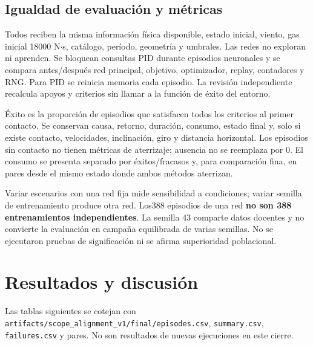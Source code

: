 \documentclass[12pt,a4paper]{article}
\begin{document}
\subsection{Igualdad de evaluación y métricas}
Todos reciben la misma información física disponible,\allowbreak{} estado inicial,\allowbreak{} viento,\allowbreak{} gas inicial 18000 N\ensuremath{\cdot}s,\allowbreak{} catálogo,\allowbreak{} período,\allowbreak{} geometría y umbrales. Las redes no exploran ni aprenden. Se bloquean consultas PID durante episodios neuronales y se compara antes/\allowbreak{}después red principal,\allowbreak{} objetivo,\allowbreak{} optimizador,\allowbreak{} replay,\allowbreak{} contadores y RNG. Para PID se reinicia memoria cada episodio. La revisión independiente recalcula apoyos y criterios sin llamar a la función de éxito del entorno.


Éxito es la proporción de episodios que satisfacen todos los criterios al primer contacto. Se conservan causa,\allowbreak{} retorno,\allowbreak{} duración,\allowbreak{} consumo,\allowbreak{} estado final y,\allowbreak{} solo si existe contacto,\allowbreak{} velocidades,\allowbreak{} inclinación,\allowbreak{} giro y distancia horizontal. Los episodios sin contacto no tienen métricas de aterrizaje; ausencia no se reemplaza por 0. El consumo se presenta separado por éxitos/\allowbreak{}fracasos y,\allowbreak{} para comparación fina,\allowbreak{} en pares desde el mismo estado donde ambos métodos aterrizan.


Variar escenarios con una red fija mide sensibilidad a condiciones; variar semilla de entrenamiento produce otra red. Los388 episodios de una red \textbf{no son 388 entrenamientos independientes}. La semilla 43 comparte datos docentes y no convierte la evaluación en campaña equilibrada de varias semillas. No se ejecutaron pruebas de significación ni se afirma superioridad poblacional.



\section{Resultados y discusión}
Las tablas siguientes se cotejan con \nolinkurl{artifacts/scope_alignment_v1/final/episodes.csv},\allowbreak{} \nolinkurl{summary.csv},\allowbreak{} \nolinkurl{failures.csv} y pares. No son resultados de nuevas ejecuciones en este cierre.
\end{document}
